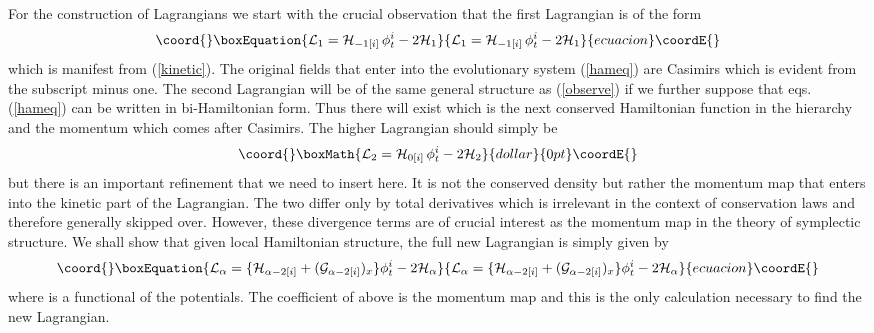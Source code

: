 \documentclass[a4paper,12pt]{article}
\begin{document}
For the construction of Lagrangians we start with the crucial
observation that the first Lagrangian is of the form
\begin{equation}\coord{}\boxEquation{
{\cal L}_1 = {\cal H}_{-1 [i]} \, \phi^i_t - 2 {\cal H}_1
\label{observe}
}{
{\cal L}_1 = {\cal H}_{-1 [i]} \, \phi^i_t - 2 {\cal H}_1
}{ecuacion}\coordE{}\end{equation}
which is manifest from (\ref{kinetic}). The original fields that
enter into the evolutionary system (\ref{hameq}) are Casimirs
which is evident from the subscript minus one. The second
Lagrangian will be of the same general structure as
(\ref{observe}) if we further suppose that eqs.(\ref{hameq}) can
be written in bi-Hamiltonian form. Thus there will exist \coordHE{}
which is the next conserved Hamiltonian function in the hierarchy
and the momentum \coordHE{} which comes after Casimirs. The higher
Lagrangian should simply be $$\coord{}\boxMath{ {\cal L}_2 = {\cal H}_{0 [i]} \,
\phi^i_t - 2 {\cal H}_2}{dollar}{0pt}\coordE{}$$ but there is an important refinement
that we need to insert here. It is not the conserved density but
rather the momentum map that enters into the kinetic part of the
Lagrangian. The two differ only by total derivatives which is
irrelevant in the context of conservation laws and therefore
generally skipped over. However, these divergence terms are of
crucial interest as the momentum map in the theory of symplectic
structure. We shall show that given \coordHE{} local
Hamiltonian structure, the full new Lagrangian is simply given by
\begin{equation}\coord{}\boxEquation{
{\cal L}_\alpha = \{ {\cal H}_{\alpha-2 [i]} + ({\cal G}_{\alpha
-2  [i]} )_x \} \phi^i_t - 2 {\cal H}_{\alpha} \label{genexp}
}{
{\cal L}_\alpha = \{ {\cal H}_{\alpha-2 [i]} + ({\cal G}_{\alpha
-2  [i]} )_x \} \phi^i_t - 2 {\cal H}_{\alpha} }{ecuacion}\coordE{}\end{equation}
where \coordHE{} is a functional of the potentials.
The coefficient of \coordHE{} above is the momentum map and this
is the only calculation necessary to find the new Lagrangian.
\end{document}
